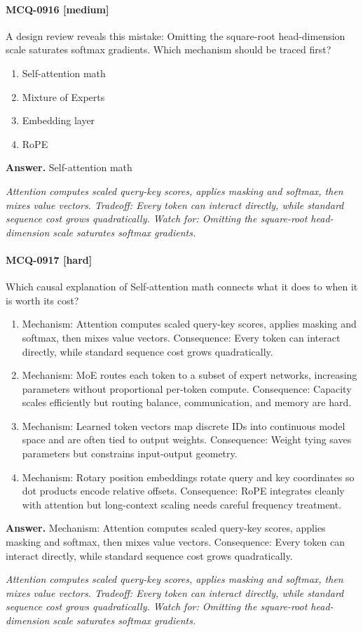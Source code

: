 \paragraph{MCQ-0916 [medium]} A design review reveals this mistake: Omitting the square-root head-dimension scale saturates softmax gradients. Which mechanism should be traced first?
\begin{enumerate}[label=\Alph*.]
\item Self-attention math
\item Mixture of Experts
\item Embedding layer
\item RoPE
\end{enumerate}
\noindent\textbf{Answer.} Self-attention math
\par\textit{Attention computes scaled query-key scores, applies masking and softmax, then mixes value vectors. Tradeoff: Every token can interact directly, while standard sequence cost grows quadratically. Watch for: Omitting the square-root head-dimension scale saturates softmax gradients.}
\paragraph{MCQ-0917 [hard]} Which causal explanation of Self-attention math connects what it does to when it is worth its cost?
\begin{enumerate}[label=\Alph*.]
\item Mechanism: Attention computes scaled query-key scores, applies masking and softmax, then mixes value vectors. Consequence: Every token can interact directly, while standard sequence cost grows quadratically.
\item Mechanism: MoE routes each token to a subset of expert networks, increasing parameters without proportional per-token compute. Consequence: Capacity scales efficiently but routing balance, communication, and memory are hard.
\item Mechanism: Learned token vectors map discrete IDs into continuous model space and are often tied to output weights. Consequence: Weight tying saves parameters but constrains input-output geometry.
\item Mechanism: Rotary position embeddings rotate query and key coordinates so dot products encode relative offsets. Consequence: RoPE integrates cleanly with attention but long-context scaling needs careful frequency treatment.
\end{enumerate}
\noindent\textbf{Answer.} Mechanism: Attention computes scaled query-key scores, applies masking and softmax, then mixes value vectors. Consequence: Every token can interact directly, while standard sequence cost grows quadratically.
\par\textit{Attention computes scaled query-key scores, applies masking and softmax, then mixes value vectors. Tradeoff: Every token can interact directly, while standard sequence cost grows quadratically. Watch for: Omitting the square-root head-dimension scale saturates softmax gradients.}
